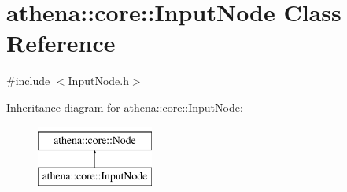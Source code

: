 \hypertarget{classathena_1_1core_1_1_input_node}{}\section{athena\+:\+:core\+:\+:Input\+Node Class Reference}
\label{classathena_1_1core_1_1_input_node}


{\ttfamily \#include $<$Input\+Node.\+h$>$}

Inheritance diagram for athena\+:\+:core\+:\+:Input\+Node\+:\begin{figure}[H]
\begin{center}
\leavevmode
\includegraphics[height=2.000000cm]{dd/ddd/classathena_1_1core_1_1_input_node}
\end{center}
\end{figure}
